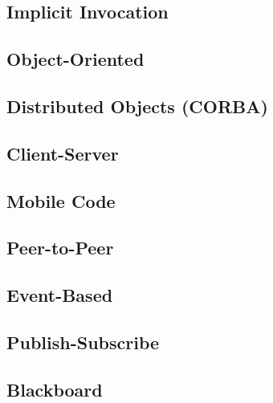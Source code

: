 \subsection{Implicit Invocation}


\subsection{Object-Oriented}


\subsection{Distributed Objects (CORBA)}


\subsection{Client-Server}


\subsection{Mobile Code}


\subsection{Peer-to-Peer}


\subsection{Event-Based}


\subsection{Publish-Subscribe}


\subsection{Blackboard}

